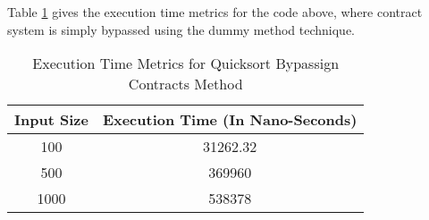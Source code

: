 Table \ref{tab:SortBypassContracts} gives the execution time metrics for the code above, where contract system is simply bypassed using the dummy method technique.

\begin{table}[htb]
\caption{Execution Time Metrics for Quicksort Bypassign Contracts Method\label{tab:SortBypassContracts}}
\begin{center}
\begin{tabular}{c||c}
\hline
Input Size & Execution Time (In Nano-Seconds) \\
\hline
\hline
100 & 31262.32\\
500 & 369960\\
1000 & 538378\\

\hline
\end{tabular}
\end{center}
\end{table}